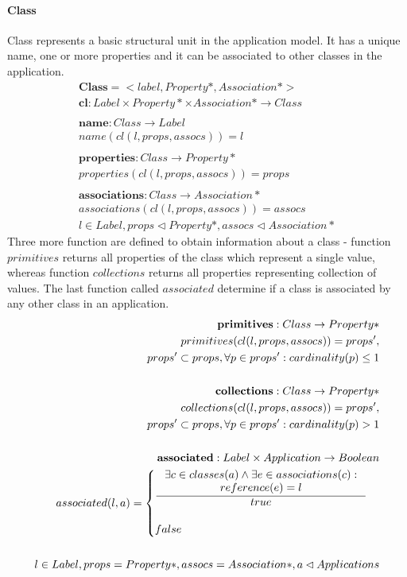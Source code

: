 \documentclass[11pt]{article}
\begin{document}
\paragraph{Class} Class represents a basic structural unit in the application model. It has a unique name, one or more properties and it can be associated to other classes in the application. 
\begin{align*}
	\mathbf{Class} = <label, Property*, Association*> \\
	\mathbf{cl} : Label \times Property* \times Association* \rightarrow Class \\\\
	\mathbf{name} : Class \rightarrow Label \\
	name(cl(l, props, assocs)) = l \\ \\
	\mathbf{properties} : Class \rightarrow Property* \\
	properties(cl(l, props, assocs)) = props \\ \\
	\mathbf{associations} : Class \rightarrow Association* \\	associations(cl(l, props, assocs)) = assocs \\ 
	l \in Label, props \lhd Property*, assocs \lhd Association*
\end{align*}
Three more function are defined to obtain information about a class - function $primitives$ returns all properties of the class which represent a single value, whereas function $collections$ returns all properties representing collection of values. The last function called $associated$ determine if a class is associated by any other class in an application.
\begin{align*}
	\mathbf{primitives} : Class \rightarrow Property* \\	primitives(cl(l, props, assocs)) = props', \\ props' \subset props,  \forall p \in props' : cardinality(p) \leq 1 \\ \\
	\mathbf{collections} : Class \rightarrow Property* \\	collections(cl(l, props, assocs)) = props', \\ props' \subset props, \forall p \in props' : cardinality(p) > 1 \\ \\
	\mathbf{associated} :  Label \times Application \rightarrow Boolean \\
  	associated(l,a) = \begin{cases}
  		\inference{\exists c \in classes(a) \wedge \exists e \in associations(c) : \\ reference(e) = l
  	}{ true } \\\\
 		false
 	\end{cases} \\ \\
	l \in Label, props = Property*, assocs = Association*,a \lhd Applications
\end{align*}
	 
\end{document}
